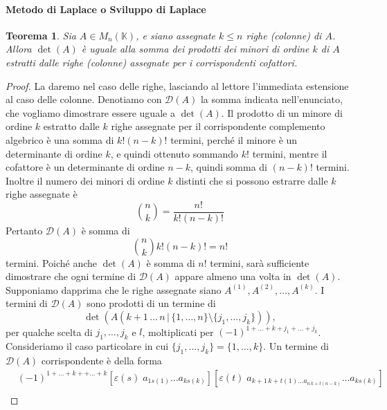 \documentclass{article}
\theoremstyle{plain}
\newtheorem{thm}{Teorema}[section]
\theoremstyle{definition}
\theoremstyle{remark}
\begin{document}
\vspace{10pt}

\paragraph{Metodo di Laplace o Sviluppo di Laplace}
\begin{bxthm}
\begin{thm}
    Sia \( A \in M_n(\mathbb{K}) \), e siano assegnate \( k\leq n \) righe (colonne) di \( A \). 
    Allora \( \det(A) \) è uguale alla somma dei prodotti dei minori di ordine \( k \) di \( A \) estratti dalle righe (colonne) assegnate per i corrispondenti cofattori.
\end{thm}
\end{bxthm}
\begin{proof}
    La daremo nel caso delle righe, lasciando al lettore l'immediata estensione al caso delle colonne.
    Denotiamo con \( \mathcal{D}(A) \) la somma indicata nell'enunciato, che vogliamo dimostrare essere uguale a $\det(A)$. 
    Il prodotto di un minore di ordine \( k \) estratto dalle \( k \) righe assegnate per il corrispondente complemento algebrico è una 
    somma di \( k! (n-k)! \) termini, perché il minore è un determinante di ordine \( k \), e quindi ottenuto sommando \( k! \) termini, mentre il 
    cofattore è un determinante di ordine \( n-k \), quindi somma di \( (n-k)! \) termini. Inoltre il numero dei minori di ordine \( k \) distinti che si possono estrarre dalle \( k \) righe assegnate è
    \[ \binom{n}{k} = \dfrac{n!}{k!(n-k)!}\]
    Pertanto \( \mathcal{D}(A) \) è somma di \[\binom{n}{k} k! (n-k)! = n! \] termini. Poiché anche $\det(A)$ è somma di \( n! \) termini, sarà sufficiente 
    dimostrare che ogni termine di \( \mathcal{D}(A) \) appare almeno una volta in $\det(A)$.
    Supponiamo dapprima che le righe assegnate siano \( A^{(1)}, A^{(2)}, \ldots, A^{(k)} \). I termini di \( \mathcal{D}(A) \) sono prodotti di un termine di 
    \[\det(A(k+1\,\ldots\,n\,|\,\{1,\ldots,n\}\setminus\{j_1,\ldots,j_k\})),\] per qualche scelta di \( j_1, \ldots, j_k \) e \( l \), moltiplicati 
    per \((-1)^{1+ \ldots +k+j_1+\ldots+j_k} \). 
    Consideriamo il caso particolare in cui \(\{j_1, \ldots, j_k\} = \{1, \ldots, k\} \). Un termine di \( \mathcal{D}(A) \) corrispondente è della forma
    \begin{equation}
        \begin{aligned}
            &(-1)^{1+ \ldots +k++ \ldots +k}[\varepsilon(s)\;a_{1s(1)}\ldots a_{ks(k)}][\varepsilon(t)\;a_{k+1\,k+ t(1)\ldots a_{n\, k+t(n-k)}}\ldots a_{ks(k)}]\\

\end{aligned}
\end{equation}
\end{proof}
\end{document}
